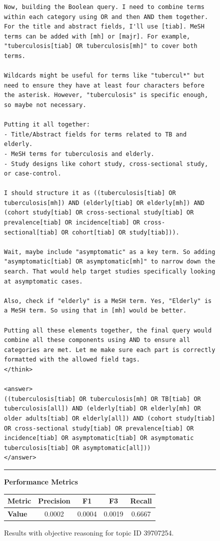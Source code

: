 \begin{figure}[p]
\begin{CombinedBox}
\begin{lstlisting}
Now, building the Boolean query. I need to combine terms within each category using OR and then AND them together. For the title and abstract fields, I'll use [tiab]. MeSH terms can be added with [mh] or [majr]. For example, "tuberculosis[tiab] OR tuberculosis[mh]" to cover both terms. 

Wildcards might be useful for terms like "tubercul*" but need to ensure they have at least four characters before the asterisk. However, "tuberculosis" is specific enough, so maybe not necessary. 

Putting it all together: 
- Title/Abstract fields for terms related to TB and elderly.
- MeSH terms for tuberculosis and elderly.
- Study designs like cohort study, cross-sectional study, or case-control.

I should structure it as ((tuberculosis[tiab] OR tuberculosis[mh]) AND (elderly[tiab] OR elderly[mh]) AND (cohort study[tiab] OR cross-sectional study[tiab] OR prevalence[tiab] OR incidence[tiab] OR cross-sectional[tiab] OR cohort[tiab] OR study[tiab])).

Wait, maybe include "asymptomatic" as a key term. So adding "asymptomatic[tiab] OR asymptomatic[mh]" to narrow down the search. That would help target studies specifically looking at asymptomatic cases.

Also, check if "elderly" is a MeSH term. Yes, "Elderly" is a MeSH term. So using that in [mh] would be better. 

Putting all these elements together, the final query would combine all these components using AND to ensure all categories are met. Let me make sure each part is correctly formatted with the allowed field tags.
</think>

<answer>  
((tuberculosis[tiab] OR tuberculosis[mh] OR TB[tiab] OR tuberculosis[all]) AND (elderly[tiab] OR elderly[mh] OR older adults[tiab] OR elderly[all]) AND (cohort study[tiab] OR cross-sectional study[tiab] OR prevalence[tiab] OR incidence[tiab] OR asymptomatic[tiab] OR asymptomatic tuberculosis[tiab] OR asymptomatic[all]))  
</answer>
		\end{lstlisting}
		
		\vspace{0.5em}
		\hrule
		\vspace{0.5em}
		
		\textbf{\small Performance Metrics}
		
		\vspace{0.3em}
		{\small
			\begin{tabular}{@{}lcccc@{}}
				\toprule
				\textbf{Metric} & Precision & F1 & F3 & Recall \\
				\midrule
				\textbf{Value} & 0.0002 & 0.0004 & 0.0019 & 0.6667 \\
				\bottomrule
			\end{tabular}
		}
	\end{CombinedBox}
	
	\caption{Results with objective reasoning for topic ID 39707254.}
	\label{fig:topic_39707254_objective_reasoning}
\end{figure}



